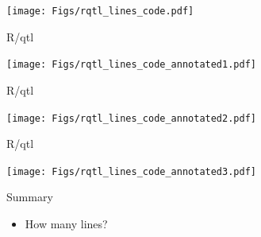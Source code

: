 \documentclass[12pt]{article}
\newcommand{\headsize}{\fontsize{35}{35} \selectfont}
\newcommand{\smallsize}{\fontsize{25}{30} \selectfont}
\begin{document}
{\vfill

\centerline{\texttt{[image: Figs/rqtl\_lines\_code.pdf]}}

\vspace{15mm}


\newpage

\addtocounter{page}{-1}

\headsize \color{myyellow}
\hfill \begin{minipage}{5.75in}
\centering
R/qtl
\end{minipage}

\vfill

\centerline{\texttt{[image: Figs/rqtl\_lines\_code\_annotated1.pdf]}}

\vspace{15mm}


\newpage

\addtocounter{page}{-1}

\headsize \color{myyellow}
\hfill \begin{minipage}{5.75in}
\centering
R/qtl
\end{minipage}

\vfill

\centerline{\texttt{[image: Figs/rqtl\_lines\_code\_annotated2.pdf]}}

\vspace{15mm}


\newpage

\addtocounter{page}{-1}

\headsize \color{myyellow}
\hfill \begin{minipage}{5.75in}
\centering
R/qtl
\end{minipage}

\vfill

\centerline{\texttt{[image: Figs/rqtl\_lines\_code\_annotated3.pdf]}}

\vspace{15mm}


\newpage

\headsize \color{myyellow}
\hfill \begin{minipage}{5.75in}
\centering
Summary
\end{minipage}

\vspace{15mm}

\color{mywhite}
\smallsize

\hfill \begin{minipage}{10in}
\begin{itemize}
\itemsep24pt
\item How many lines?


\end{itemize}
\end{minipage}}
\end{document}
